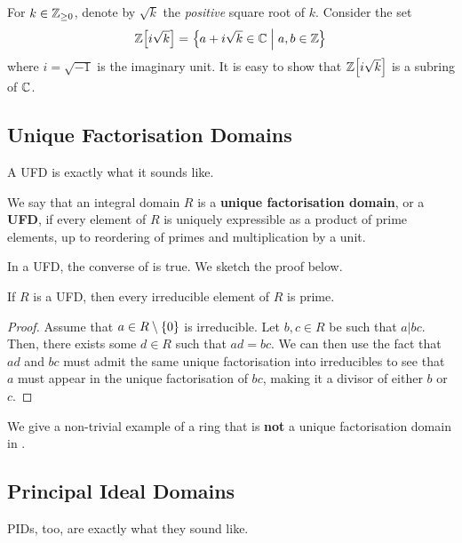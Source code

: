 \begin{boxexample}\label{Ch2:Eg:Z[i sqrt(k)]}
    For $k \in \mathbb{Z}_{\geq 0}$, denote by $\sqrt{k}$ the \textit{positive} square root of $k$. Consider the set
    \begin{align}
        \mathbb{Z}\!\left[ i \sqrt{k} \right] = \left\{ a + i\sqrt{k} \in \mathbb{C} \; \middle\vert \; a, b \in \mathbb{Z} \right\}
    \end{align}
    where $i = \sqrt{-1}$ is the imaginary unit. It is easy to show that $\mathbb{Z}\!\left[ i\sqrt{k} \right]$ is a subring of $\mathbb{C}$.
\end{boxexample}

\subsection{Unique Factorisation Domains}

A UFD is exactly what it sounds like.

\begin{boxdefinition}
    We say that an integral domain $R$ is a \textbf{unique factorisation domain}, or a \textbf{UFD}, if every element of $R$ is uniquely expressible as a product of prime elements, up to reordering of primes and multiplication by a unit.
\end{boxdefinition}

In a UFD, the converse of  is true. We sketch the proof below.

\begin{boxlemma}
    If $R$ is a UFD, then every irreducible element of $R$ is prime.
\end{boxlemma}
\begin{proof}
    Assume that $a \in R \setminus \left\{ 0 \right\}$ is irreducible. Let $b, c \in R$ be such that $a \vert bc$. Then, there exists some $d \in R$ such that $ad = bc$. We can then use the fact that $ad$ and $bc$ must admit the same unique factorisation into irreducibles to see that $a$ must appear in the unique factorisation of $bc$, making it a divisor of either $b$ or $c$.
\end{proof}

We give a non-trivial example of a ring that is \textbf{not} a unique factorisation domain in .

\subsection{Principal Ideal Domains}

PIDs, too, are exactly what they sound like.

